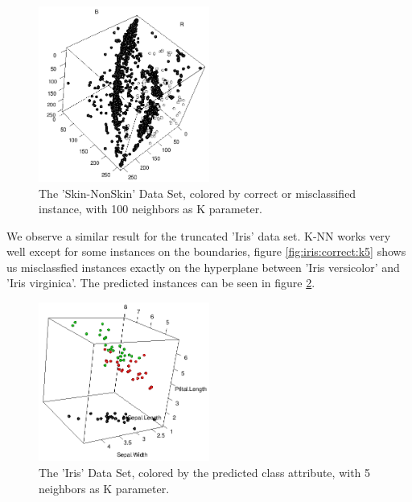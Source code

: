 \documentclass[paper=a4, fontsize=11pt]{scrartcl} %
\numberwithin{equation}{section} %
\numberwithin{figure}{section} %
\numberwithin{table}{section} %
\begin{document}
\begin{figure}[0.5\textwidth]
    \begin{center}
\includegraphics[width=0.5\textwidth]{Skin_correct_k100}
    \end{center}
\caption['Skin-NonSkin' correctness with k=100]{The 'Skin-NonSkin' Data Set, colored by correct or misclassified instance, with 100 neighbors as K parameter.}
\label{fig:skin:correct:k100}
\end{figure}

We observe a similar result for the truncated 'Iris' data set. K-NN works very well except for some instances on the boundaries, figure \ref{fig:iris:correct:k5} shows us misclassfied instances exactly on the hyperplane between 'Iris versicolor' and 'Iris virginica'. The predicted instances can be seen in figure \ref{fig:iris:predicted:k5}.
\begin{figure}[0.5\textwidth]
    \begin{center}
\includegraphics[width=0.5\textwidth]{Iris_predicted_k5}
    \end{center}
\caption['Iris' prediction with k=5]{The 'Iris' Data Set, colored by the predicted class attribute, with 5 neighbors as K parameter.}
\label{fig:iris:predicted:k5}
\end{figure}
\end{document}
